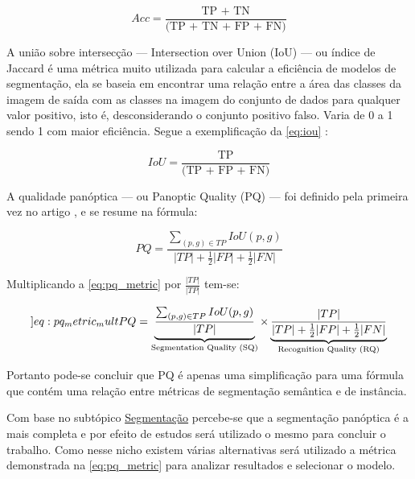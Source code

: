 \begin{equation}
	\label{eq:acc}
	Acc = \frac{\text{TP + TN}}{\text{(TP + TN + FP + FN)}}
\end{equation}


A união sobre intersecção — Intersection over Union (IoU) — ou índice de Jaccard é uma métrica muito utilizada para calcular a eficiência de modelos de segmentação, ela se baseia em encontrar uma relação entre a área das classes da imagem de saída com as classes na imagem do conjunto de dados para qualquer valor positivo, isto é, desconsiderando o conjunto positivo falso. Varia de 0 a 1 sendo 1 com maior eficiência. Segue a exemplificação da \cref{eq:iou} \space\cite{iou_metric_link}:

\begin{equation}
	\label{eq:iou}
	IoU = \frac{\text{TP}}{\text{(TP + FP + FN)}}
\end{equation}


A qualidade panóptica — ou Panoptic Quality (PQ) — foi definido pela primeira vez no artigo \space{}, e se resume na fórmula:

\begin{equation}
\label{eq:pq_metric}
PQ = \frac{\sum_{(p,g)\in TP}IoU(p,g)}{ |TP| + \frac{1}{2}|FP| + \frac{1}{2}|FN|}
\end{equation}

Multiplicando a \cref{eq:pq_metric} por $\frac{|TP|}{|TP|}$ tem-se:

\begin{equation}
	\label[]{eq:pq_metric_mult}
	PQ = \underbrace{\frac{\sum_{(p,g)\in TP}IoU(p,g)}{|TP|}}_{\text{Segmentation Quality (SQ)}}
	\times
	\underbrace{\frac{|TP|}{|TP| + \frac{1}{2}|FP| + \frac{1}{2}|FN|}}_{\text{Recognition Quality (RQ)}}
\end{equation}

Portanto pode-se concluir que PQ é apenas uma simplificação para uma fórmula que contém uma relação entre métricas de segmentação semântica e de instância.

Com base no subtópico \hyperref[sec:segmentacao]{Segmentação} percebe-se que a segmentação panóptica é a mais completa e por efeito de estudos será utilizado o mesmo para concluir o trabalho. Como nesse nicho existem várias alternativas será utilizado a métrica demonstrada na \cref{eq:pq_metric} para analizar resultados e selecionar o modelo.

